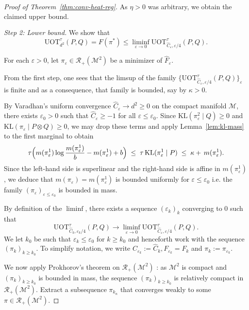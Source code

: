 \documentclass{article}
\theoremstyle{plain}
\theoremstyle{definition}
\theoremstyle{remark}
\newcommand{\M}{\ensuremath{\mathcal{M}}}
\begin{document}
\begin{proof}[Proof of Theorem~\ref{thm:conv-heat-reg}]
As $\eta > 0$ was arbitrary, we obtain the claimed upper bound.

\medskip
\textit{Step 2: Lower bound.}
We show that 
\[
\mathrm{UOT}^{\tau}_{d^2}(P,Q) = F(\pi^*)
\le
\liminf_{\varepsilon\to0}
\mathrm{UOT}^{\tau}_{\widehat C_{\varepsilon},\varepsilon/4}(P,Q).
\]

For each \(\varepsilon>0\), let \(\pi_\varepsilon\in\mathcal R_+(\M^2)\) be a minimizer of \(\hat F_\varepsilon\).

From the first step, one sees that the limsup of the family $\{\mathrm{UOT}^{\tau}_{\widehat{C}_\varepsilon, \varepsilon/4}(P,Q)\}_{\varepsilon}$ is finite and as a consequence, that family is bounded, say by $\kappa > 0$. 

By Varadhan's uniform convergence $\widehat C_\varepsilon\to d^2\ge 0$ on the compact manifold $\M$, there exists $\varepsilon_{0}>0$ such that $\widehat C_\varepsilon\ge -1$ for all $\varepsilon\le\varepsilon_0$. Since $\mathrm{KL}(\pi_\varepsilon^2\mid Q)\ge 0$ and $\mathrm{KL}(\pi_\varepsilon\mid P\otimes Q)\ge 0$, we may drop these terms and apply Lemma~\ref{lem:kl-mass} to the first marginal to obtain
\[
\tau\Bigl(m(\pi_\varepsilon^1)\log\frac{m(\pi_\varepsilon^1)}{b} - m(\pi_\varepsilon^1) + b\Bigr)
\;\le\;
\tau\,\mathrm{KL}(\pi_\varepsilon^1\mid P)
\;\le\;
\kappa + \,m(\pi_\varepsilon^1).
\]
Since the left-hand side is superlinear and the right-hand side is affine in $m(\pi_\varepsilon^1)$, we deduce that $m(\pi_\varepsilon)=m(\pi_\varepsilon^1)$ is bounded uniformly for $\varepsilon \le \varepsilon_{0}$ i.e. the family $(\pi_{\varepsilon})_{\varepsilon \le \varepsilon_{0}}$ is bounded in mass.

By definition of the \(\liminf\), there exists a sequence \((\varepsilon_k)_k\) converging to $0$ such that 
\[
\mathrm{UOT}^{\tau}_{\widehat{C}_k,\varepsilon_k/4}(P,Q)
\longrightarrow
\liminf_{\varepsilon\to0}
\mathrm{UOT}^{\tau}_{\widehat C_{\varepsilon},\varepsilon/4}(P,Q).\]
We let $k_0$ be such that $\varepsilon_{k}\leq \varepsilon_0$ for $k\geq k_0$ and henceforth work with the sequence $(\pi_{k})_{k \geq k_0}$. To simplify notation, we write $\widehat{C}_{\varepsilon_k}:=\widehat{C}_k, F_{\varepsilon_{k}} = F_k$ and $\pi_k:=\pi_{\varepsilon_k}$.

We now apply Prokhorov's theorem on $\mathcal{R}_{+}(\M^2)$ : as $\M^2$ is compact and $(\pi_{k})_{k \ge k_{0}}$ is bounded in mass, the sequence $(\pi_{k})_{k \geq k_0}$ is relatively compact in $\mathcal{R}_{+}(\M^2)$. Extract a subsequence $\pi_{k_n}$ that converges weakly to some $\pi\in\mathcal{R}_+(\M^2)$.


\end{proof}
\end{document}
